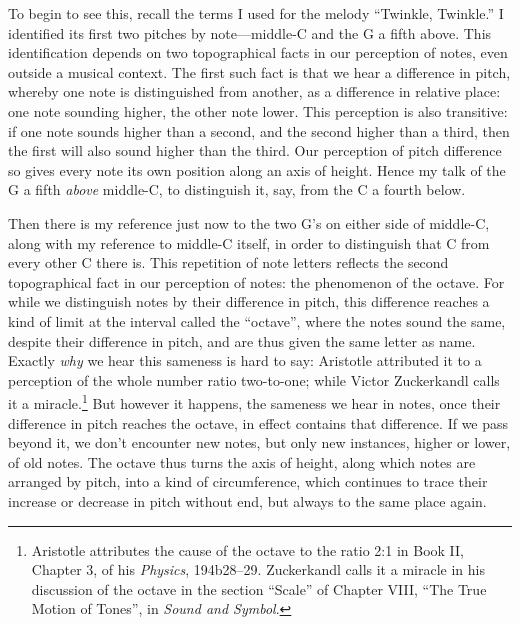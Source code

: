 \documentclass[12pt]{memoir}
\begin{document}
To begin to see this, recall the terms I used for
the melody ``Twinkle, Twinkle.'' I identified its
first two pitches by note---middle-C and the G a
fifth above. This identification depends on two
topographical facts in our perception of notes,
even outside a musical context. The first such
fact is that we hear a difference in pitch,
whereby one note is distinguished from another, as
a difference in relative place: one note sounding
higher, the other note lower. This perception is
also transitive: if one note sounds higher than a
second, and the second higher than a third, then
the first will also sound higher than the third.
Our perception of pitch difference so gives every
note its own position along an axis of height.
Hence my talk of the G a fifth \emph{above}
middle-C, to distinguish it, say, from the C a
fourth below.

Then there is my reference just now to the two G's
on either side of middle-C, along with my
reference to middle-C itself, in order to
distinguish that C from every other C there is.
This repetition of note letters reflects the
second topographical fact in our perception of
notes: the phenomenon of the octave. For while we
distinguish notes by their difference in pitch,
this difference reaches a kind of limit at the
interval called the ``octave'', where the notes
sound the same, despite their difference in pitch,
and are thus given the same letter as name.
Exactly \emph{why} we hear this sameness is hard
to say: Aristotle attributed it to a perception of
the whole number ratio two-to-one; while Victor
Zuckerkandl calls it a miracle.\footnote{Aristotle
    attributes the cause of the octave to the
    ratio 2:1 in Book II, Chapter 3, of his
    \emph{Physics}, 194b28--29. Zuckerkandl calls
    it a miracle in his discussion of the octave
    in the section ``Scale'' of Chapter VIII,
    ``The True Motion of Tones'', in \emph{Sound
        and Symbol}.} But however it happens, the
sameness we hear in notes, once their difference
in pitch reaches the octave, in effect contains
that difference. If we pass beyond it, we don't
encounter new notes, but only new instances,
higher or lower, of old notes. The octave thus
turns the axis of height, along which notes are
arranged by pitch, into a kind of circumference,
which continues to trace their increase or
decrease in pitch without end, but always to the
same place again.
\end{document}
